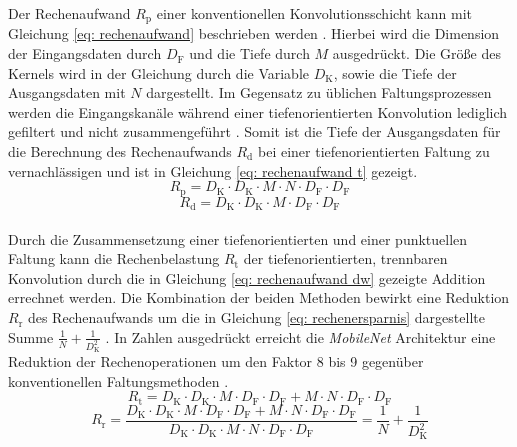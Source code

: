 		Der Rechenaufwand $R_\text{p}$ einer konventionellen Konvolutionsschicht kann mit Gleichung \ref{eq: rechenaufwand} beschrieben werden \cite{mobilenets}. Hierbei wird die Dimension der Eingangsdaten durch $D_\text{F}$ und die Tiefe durch $M$ ausgedrückt. Die Größe des Kernels wird in der Gleichung durch die Variable $D_\text{K}$, sowie die Tiefe der Ausgangsdaten mit $N$ dargestellt. Im Gegensatz zu üblichen Faltungsprozessen werden die Eingangskanäle während einer tiefenorientierten Konvolution lediglich gefiltert und nicht zusammengeführt \cite{mobilenets}. Somit ist die Tiefe der Ausgangsdaten für die Berechnung des Rechenaufwands $R_\text{d}$ bei einer tiefenorientierten Faltung zu vernachlässigen und ist in Gleichung \ref{eq: rechenaufwand t} gezeigt. \\
		
		\begin{equation}
			R_\text{p}=D_\text{K} \cdot D_\text{K} \cdot M \cdot N \cdot D_\text{F} \cdot D_\text{F}
			\label{eq: rechenaufwand}
		\end{equation}
		\begin{equation}
		R_\text{d}=D_\text{K} \cdot D_\text{K} \cdot M \cdot D_\text{F} \cdot D_\text{F}
		\label{eq: rechenaufwand t}
		\end{equation}\\
	
		Durch die Zusammensetzung einer tiefenorientierten und einer punktuellen Faltung kann die Rechenbelastung $R_\text{t}$ der tiefenorientierten, trennbaren Konvolution durch die in Gleichung \ref{eq: rechenaufwand dw} gezeigte Addition errechnet werden. Die Kombination der beiden Methoden bewirkt eine Reduktion $R_\text{r}$ des Rechenaufwands um die in Gleichung \ref{eq: rechenersparnis} dargestellte Summe $\frac{1}{N}+\frac{1}{D^2_\text{K}}$ \cite{mobilenets}. In Zahlen ausgedrückt erreicht die \textit{MobileNet} Architektur eine Reduktion der Rechenoperationen um den Faktor 8 bis 9 gegenüber konventionellen Faltungsmethoden \cite{mobilenets}.  \\
	
		\begin{equation}
			R_\text{t}=D_\text{K} \cdot D_\text{K} \cdot M \cdot D_\text{F} \cdot D_\text{F} + M \cdot N \cdot D_\text{F} \cdot D_\text{F}
			\label{eq: rechenaufwand dw}
		\end{equation}
		\begin{equation}
			R_\text{r}=\frac{D_\text{K} \cdot D_\text{K} \cdot M \cdot D_\text{F} \cdot D_\text{F} + M \cdot N \cdot D_\text{F} \cdot D_\text{F}}{D_\text{K} \cdot D_\text{K} \cdot M \cdot N \cdot D_\text{F} \cdot D_\text{F}}=\frac{1}{N}+\frac{1}{D^2_\text{K}}
			\label{eq: rechenersparnis}
		\end{equation}\\
		
